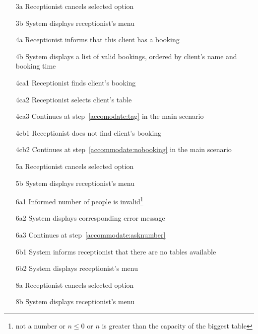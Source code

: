 \documentclass[a4paper,11pt,oneside]{book}
\begin{document}
\begin{enumerate}
\item [3a] Receptionist cancels selected option
\item [3b] System displays receptionist's menu
\\
\item [4a] Receptionist informs that this client has a booking
\item [4b] System displays a list of valid bookings, ordered by client's name and booking time
\\
\item [4ca1] Receptionist finds client's booking
\item [4ca2] Receptionist selects client's table
\item [4ca3] Continues at step~\ref{accomodate:tag} in the main scenario
\\
\item [4cb1] Receptionist does not find client's booking
\item [4cb2] Continues at step~\ref{accommodate:nobooking} in the main scenario
\\
\item [5a] Receptionist cancels selected option
\item [5b] System displays receptionist's menu
\\
\item [6a1] Informed number of people is invalid\footnote{not a number or $n \leq 0$ or $n$ is greater than the capacity of the biggest table}
\item [6a2] System displays corresponding error message
\item [6a3] Continues at step~\ref{accommodate:asknumber}
\\
\item [6b1] System informs receptionist that there are no tables available
\item [6b2] System displays receptionist's menu
\\
\item [8a] Receptionist cancels selected option
\item [8b] System displays receptionist's menu
\\
\end{enumerate}
\end{document}
